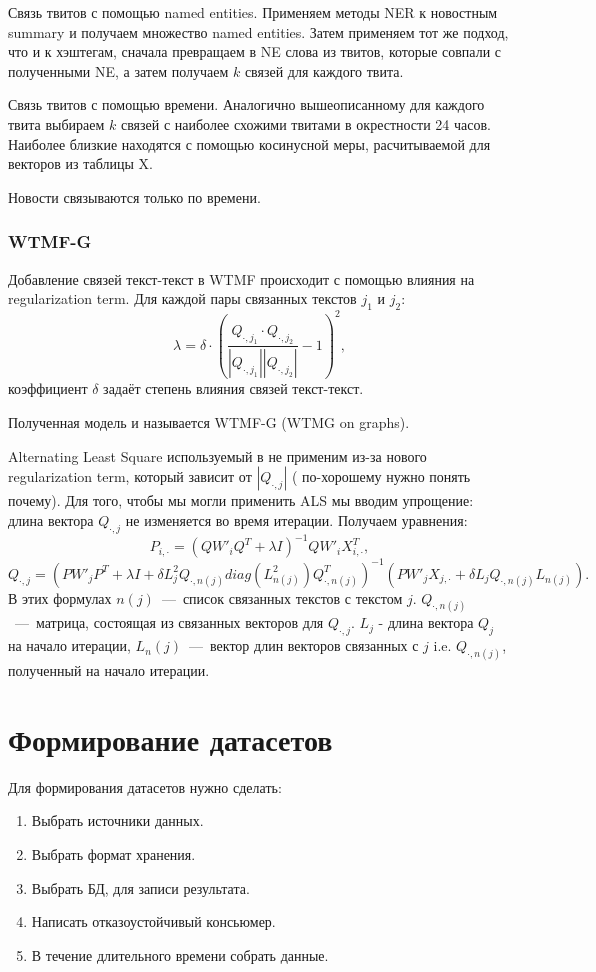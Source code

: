 \documentclass[14pt,a4paper,oneside]{extarticle}
\begin{document}
            Связь твитов с помощью named entities. Применяем методы NER к новостным summary и получаем множество named entities. Затем применяем тот же подход, что и к хэштегам, сначала превращаем в NE слова из твитов, которые совпали с полученными NE, а затем получаем $k$ связей для каждого твита.

            Связь твитов с помощью времени. Аналогично вышеописанному для каждого твита выбираем $k$ связей с наиболее схожими твитами в окрестности 24 часов. Наиболее близкие находятся с помощью косинусной меры, расчитываемой для векторов из таблицы X.

            Новости связываются только по времени.
        \subsubsection{WTMF-G}
            Добавление связей текст-текст в WTMF происходит с помощью влияния на regularization term. Для каждой пары связанных текстов $j_1$ и $j_2$:
            $$\lambda = \delta \cdot (\dfrac{Q_{\cdot,j_1}\cdot Q_{\cdot,j_2}}{|Q_{\cdot,j_1}|| Q_{\cdot,j_2}|}-1)^2,$$
            коэффициент $\delta$ задаёт степень влияния связей текст-текст.

            Полученная модель и называется WTMF-G (WTMG on graphs).

            Alternating Least Square используемый в \cite{steck_recommender} не применим из-за нового regularization term, который зависит от $|Q_{\cdot,j}|$ ({\color{red} по-хорошему нужно понять почему}). Для того, чтобы мы могли применить ALS мы вводим упрощение: длина вектора $Q_{\cdot,j}$ не изменяется во время итерации. Получаем уравнения:
            $$P_{i, \cdot} = (Q W'_i Q^T + \lambda I)^{-1} Q W'_i X_{i,\cdot}^T,$$
            $$Q_{\cdot, j} = (P W'_j P^T + \lambda I + \delta  L_j^2 Q_{\cdot,n(j)} diag(L^2_{n(j)})Q_{\cdot,n(j)}^T)^{-1}   (P W'_j X_{j,\cdot} + \delta  L_j Q_{\cdot,n(j)} L_{n(j)}).$$
            В этих формулах $n(j)$~---~список связанных текстов с текстом $j$. $Q_{\cdot,n(j)}$~---~матрица, состоящая из связанных векторов для $Q_{\cdot, j}$. $L_j$ - длина вектора $Q_j$ на начало итерации, $L_n(j)$~---~вектор длин векторов связанных с $j$ i.e. $Q_{\cdot,n(j)}$, полученный на начало итерации.
            


\section{Формирование датасетов}
    Для формирования датасетов нужно сделать:
    \begin{enumerate}
        \item Выбрать источники данных.
        \item Выбрать формат хранения.
        \item Выбрать БД, для записи результата.
        \item Написать отказоустойчивый консьюмер.
        \item В течение длительного времени собрать данные.
    \end{enumerate}
\end{document}
